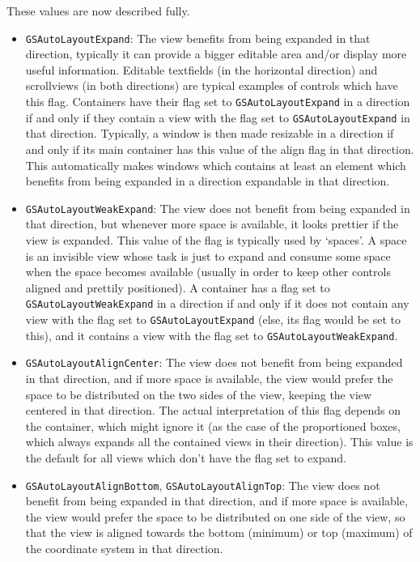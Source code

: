 These values are now described fully.
\begin{itemize}

\item \texttt{GSAutoLayoutExpand}: The view benefits from being expanded
in that direction, typically it can provide a bigger editable area
and/or display more useful information.  Editable textfields (in the
horizontal direction) and scrollviews (in both directions) are typical
examples of controls which have this flag.  Containers have their flag
set to \texttt{GSAutoLayoutExpand} in a direction if and only if they
contain a view with the flag set to \texttt{GSAutoLayoutExpand} in
that direction.  Typically, a window is then made resizable in a
direction if and only if its main container has this value of the
align flag in that direction.  This automatically makes windows which
contains at least an element which benefits from being expanded in a
direction expandable in that direction.

\item \texttt{GSAutoLayoutWeakExpand}:  The view does not benefit from being
expanded in that direction, but whenever more space is available, it
looks prettier if the view is expanded.  This value of the flag is
typically used by `spaces'.  A space is an invisible view whose task
is just to expand and consume some space when the space becomes
available (usually in order to keep other controls aligned and
prettily positioned).  A container has a flag set to
\texttt{GSAutoLayoutWeakExpand} in a direction if and only if it does 
not contain any view with the flag set to \texttt{GSAutoLayoutExpand}
(else, its flag would be set to this), and it contains a view with the
flag set to \texttt{GSAutoLayoutWeakExpand}.

\item \texttt{GSAutoLayoutAlignCenter}: The view does not benefit from being
expanded in that direction, and if more space is available, the view
would prefer the space to be distributed on the two sides of the view,
keeping the view centered in that direction.  The actual
interpretation of this flag depends on the container, which might
ignore it (as the case of the proportioned boxes, which always expands
all the contained views in their direction).  This value is the
default for all views which don't have the flag set to expand.

\item \texttt{GSAutoLayoutAlignBottom}, \texttt{GSAutoLayoutAlignTop}:
The view does not benefit from being expanded in that direction, and
if more space is available, the view would prefer the space to be
distributed on one side of the view, so that the view is aligned
towards the bottom (minimum) or top (maximum) of the coordinate system
in that direction.

\end{itemize}

